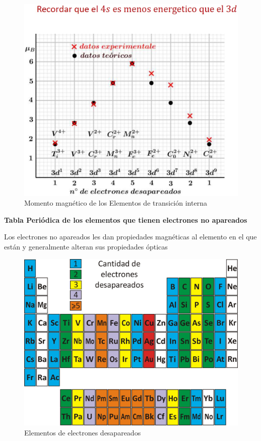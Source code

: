 \begin{figure}[H]
    \centering
    \includegraphics[width=1.0\textwidth]{./Figures/momMagElemTransicion2a}
	\caption{Momento magnético de los Elementos de transición interna}
	\label{fig:momMagElemTransicion2}
\end{figure}

\textbf{Tabla Periódica de los elementos que tienen electrones no apareados}

Los electrones no apareados les dan propiedades magnéticas al elemento en el que están y generalmente alteran sus propiedades ópticas

\begin{figure}[H]
    \centering
    \includegraphics[width=1.0\textwidth]{./Figures/TablaPeriodica2}
	\caption{Elementos de electrones desapareados}
	\label{fig:TablaPeriodica2}
\end{figure}











